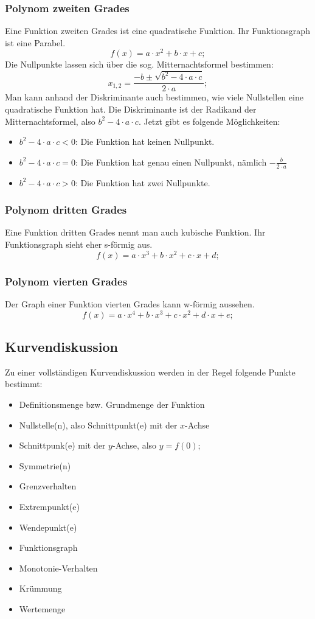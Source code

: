 \documentclass[a4paper]{article}
\begin{document}
\subsubsection{Polynom zweiten Grades}
Eine Funktion zweiten Grades ist eine quadratische Funktion.
Ihr Funktionsgraph ist eine Parabel.
\[
	f(x) = a \cdot x^2 + b \cdot x + c ;
\]
Die Nullpunkte lassen sich \"uber die sog. Mitternachtsformel bestimmen:
\[
	x_{1,2} = \frac{-b \pm \sqrt{b^2 - 4 \cdot a \cdot c}}{2 \cdot a} ;
\]
Man kann anhand der Diskriminante auch bestimmen,
wie viele Nullstellen eine quadratische Funktion hat.
Die Diskriminante ist der Radikand der Mitternachtsformel,
also $ b^2 - 4 \cdot a \cdot c $.
Jetzt gibt es folgende M\"oglichkeiten:
\begin{itemize}[nosep]
	\item $ b^2 - 4 \cdot a \cdot c < 0 $: Die Funktion hat keinen Nullpunkt.
	\item $ b^2 - 4 \cdot a \cdot c = 0 $: Die Funktion hat genau einen Nullpunkt, n\"amlich $ -\frac{b}{2 \cdot a} $
	\item $ b^2 - 4 \cdot a \cdot c > 0 $: Die Funktion hat zwei Nullpunkte.
\end{itemize}

\subsubsection{Polynom dritten Grades}
Eine Funktion dritten Grades nennt man auch kubische Funktion.
Ihr Funktionsgraph sieht eher s-f\"ormig aus.
\[
	f(x) = a \cdot x^3 + b \cdot x^2 + c \cdot x + d ;
\]

\subsubsection{Polynom vierten Grades}
Der Graph einer Funktion vierten Grades kann w-f\"ormig aussehen.
\[
	f(x) = a \cdot x^4  + b \cdot x^3 + c \cdot x^2 + d \cdot x + e ;
\]


\subsection{Kurvendiskussion}
Zu einer vollst\"andigen Kurvendiskussion werden in der Regel folgende Punkte bestimmt:
\begin{itemize}[nosep]
	\item Definitionsmenge bzw. Grundmenge der Funktion
	\item Nullstelle(n), also Schnittpunkt(e) mit der $x$-Achse
	\item Schnittpunk(e) mit der $y$-Achse, also $ y = f(0) ; $
	\item Symmetrie(n)
	\item Grenzverhalten
	\item Extrempunkt(e)
	\item Wendepunkt(e)
	\item Funktionsgraph
	\item Monotonie-Verhalten
	\item Kr\"ummung
	\item Wertemenge
\end{itemize}
\end{document}
